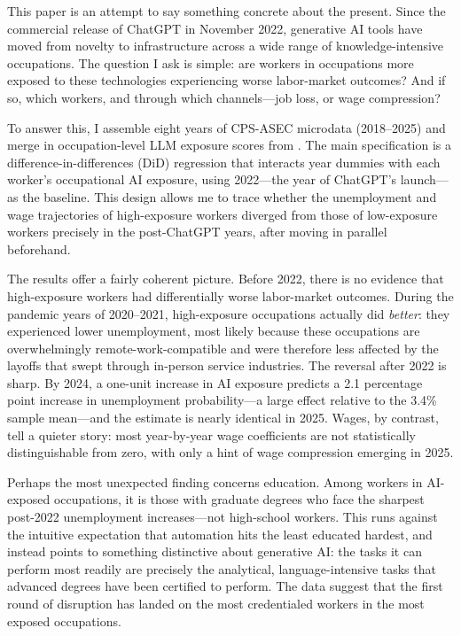 \documentclass[11pt]{article}
\begin{document}
This paper is an attempt to say something concrete about the present. Since the commercial release of ChatGPT in November 2022, generative AI tools have moved from novelty to infrastructure across a wide range of knowledge-intensive occupations. The question I ask is simple: are workers in occupations more exposed to these technologies experiencing worse labor-market outcomes? And if so, which workers, and through which channels---job loss, or wage compression?

To answer this, I assemble eight years of CPS-ASEC microdata (2018--2025) and merge in occupation-level LLM exposure scores from \textcite{eloundou2024gpts}. The main specification is a difference-in-differences (DiD) regression that interacts year dummies with each worker's occupational AI exposure, using 2022---the year of ChatGPT's launch---as the baseline. This design allows me to trace whether the unemployment and wage trajectories of high-exposure workers diverged from those of low-exposure workers precisely in the post-ChatGPT years, after moving in parallel beforehand.

The results offer a fairly coherent picture. Before 2022, there is no evidence that high-exposure workers had differentially worse labor-market outcomes. During the pandemic years of 2020--2021, high-exposure occupations actually did \emph{better}: they experienced lower unemployment, most likely because these occupations are overwhelmingly remote-work-compatible and were therefore less affected by the layoffs that swept through in-person service industries. The reversal after 2022 is sharp. By 2024, a one-unit increase in AI exposure predicts a 2.1 percentage point increase in unemployment probability---a large effect relative to the 3.4\% sample mean---and the estimate is nearly identical in 2025. Wages, by contrast, tell a quieter story: most year-by-year wage coefficients are not statistically distinguishable from zero, with only a hint of wage compression emerging in 2025.

Perhaps the most unexpected finding concerns education. Among workers in AI-exposed occupations, it is those with graduate degrees who face the sharpest post-2022 unemployment increases---not high-school workers. This runs against the intuitive expectation that automation hits the least educated hardest, and instead points to something distinctive about generative AI: the tasks it can perform most readily are precisely the analytical, language-intensive tasks that advanced degrees have been certified to perform. The data suggest that the first round of disruption has landed on the most credentialed workers in the most exposed occupations.
\end{document}
